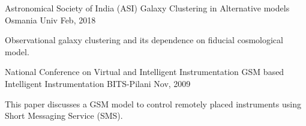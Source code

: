 \begin{cventries}
\cventry
{Astronomical Society of India (ASI)} %
{Galaxy Clustering in Alternative models} %
{Osmania Univ} %
{Feb, 2018} %
{
	\begin{cvitems} %
		\item {Observational galaxy clustering and its dependence on fiducial cosmological model.}
	\end{cvitems}		
}
   
  \cventry
    {National Conference on Virtual and Intelligent Instrumentation} %
    {GSM based Intelligent Instrumentation} %
    {BITS-Pilani} %
    {Nov, 2009} %
    {
      \begin{cvitems} %
        \item {This paper discusses a GSM model to control remotely placed instruments using Short
    Messaging Service (SMS).}
      \end{cvitems}		
    }
    
    
    

   
\end{cventries}

